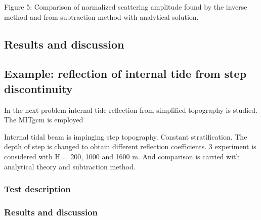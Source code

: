 Figure 5: Comparison of normalized scattering amplitude found by the inverse method and from 
subtraction method with analytical solution.

\subsection{Results and discussion}

\subsection{Example: reflection of internal tide from step discontinuity}
In the next problem internal tide reflection from simplified topography is studied. The MITgcm is 
employed 

Internal tidal beam is impinging step topography. Constant stratification. The depth of step is 
changed to obtain different reflection coefficients. 3 experiment is considered with H = 200, 1000 
and 1600 m. And comparison is carried with analytical theory and subtraction method.\\

\subsubsection{Test description}
\subsubsection{Results and discussion}

%


